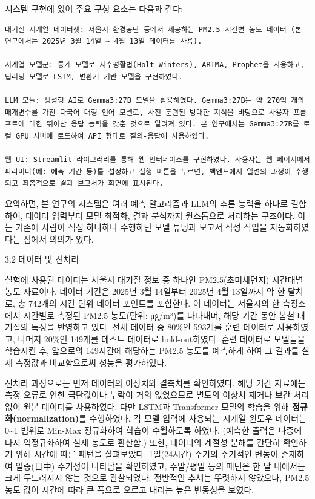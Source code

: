 \documentclass[12pt,ko,a4,]{report}
\begin{document}
시스템 구현에 있어 주요 구성 요소는 다음과 같다:

\begin{lstlisting}
대기질 시계열 데이터셋: 서울시 환경공단 등에서 제공하는 PM2.5 시간별 농도 데이터 (본 연구에서는 2025년 3월 14일 ~ 4월 13일 데이터를 사용).

시계열 모델군: 통계 모델로 지수평활법(Holt-Winters), ARIMA, Prophet을 사용하고, 딥러닝 모델로 LSTM, 변환기 기반 모델을 구현하였다.

LLM 모듈: 생성형 AI로 Gemma3:27B 모델을 활용하였다. Gemma3:27B는 약 270억 개의 매개변수를 가진 다국어 대형 언어 모델로, 사전 훈련된 방대한 지식을 바탕으로 사용자 프롬프트에 대한 뛰어난 응답 능력을 갖춘 것으로 알려져 있다. 본 연구에서는 Gemma3:27B를 로컬 GPU 서버에 로드하여 API 형태로 질의-응답에 사용하였다.

웹 UI: Streamlit 라이브러리를 통해 웹 인터페이스를 구현하였다. 사용자는 웹 페이지에서 파라미터(예: 예측 기간 등)를 설정하고 실행 버튼을 누르면, 백엔드에서 일련의 과정이 수행되고 최종적으로 결과 보고서가 화면에 표시된다.
\end{lstlisting}

요약하면, 본 연구의 시스템은 여러 예측 알고리즘과 LLM의 추론 능력을
하나로 결합하여, 데이터 입력부터 모델 최적화, 결과 분석까지 원스톱으로
처리하는 구조이다. 이는 기존에 사람이 직접 하나하나 수행하던 모델 튜닝과
보고서 작성 작업을 자동화하였다는 점에서 의의가 있다.

3.2 데이터 및 전처리

실험에 사용된 데이터는 서울시 대기질 정보 중 하나인 PM2.5(초미세먼지)
시간대별 농도 자료이다. 데이터 기간은 2025년 3월 14일부터 2025년 4월
13일까지 약 한 달치로, 총 742개의 시간 단위 데이터 포인트를 포함한다. 이
데이터는 서울시의 한 측정소에서 시간별로 측정된 PM2.5 농도(단위:
㎍/m³)를 나타내며, 해당 기간 동안 봄철 대기질의 특성을 반영하고 있다.
전체 데이터 중 80\%인 593개를 훈련 데이터로 사용하였고, 나머지 20\%인
149개를 테스트 데이터로 hold-out하였다. 훈련 데이터로 모델들을 학습시킨
후, 앞으로의 149시간에 해당하는 PM2.5 농도를 예측하게 하여 그 결과를
실제 측정값과 비교함으로써 성능을 평가하였다.

전처리 과정으로는 먼저 데이터의 이상치와 결측치를 확인하였다. 해당 기간
자료에는 측정 오류로 인한 극단값이나 누락이 거의 없었으므로 별도의
이상치 제거나 보간 처리 없이 원본 데이터를 사용하였다. 다만 LSTM과
Transformer 모델의 학습을 위해 \textbf{정규화(normalization)}를
수행하였다. 각 모델 입력에 사용되는 시계열 윈도우 데이터는
0\textasciitilde1 범위로 Min-Max 정규화하여 학습이 수월하도록 하였다.
(예측한 출력은 나중에 다시 역정규화하여 실제 농도로 환산함.) 또한,
데이터의 계절성 분해를 간단히 확인하기 위해 시간에 따른 패턴을
살펴보았다. 1일(24시간) 주기의 주기적인 변동이 존재하여 일중(日中)
주기성이 나타남을 확인하였고, 주말/평일 등의 패턴은 한 달 내에서는 크게
두드러지지 않는 것으로 관찰되었다. 전반적인 추세는 뚜렷하지 않았으나,
PM2.5 농도 값이 시간에 따라 큰 폭으로 오르고 내리는 높은 변동성을
보였다.
\end{document}
